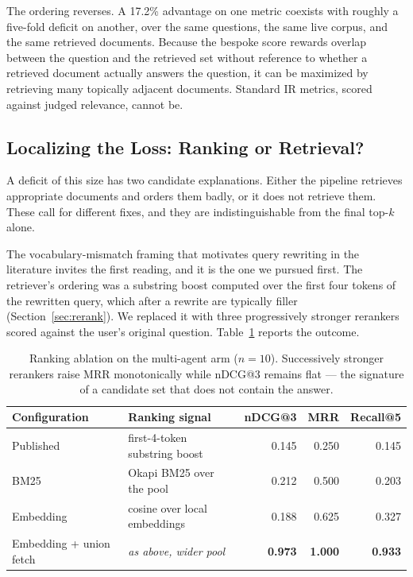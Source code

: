 The ordering reverses. A 17.2\% advantage on one metric coexists with roughly a
five-fold deficit on another, over the same questions, the same live corpus, and
the same retrieved documents. Because the bespoke score rewards overlap between
the question and the retrieved set without reference to whether a retrieved
document actually answers the question, it can be maximized by retrieving many
topically adjacent documents. Standard IR metrics, scored against judged
relevance, cannot be.

\subsection{Localizing the Loss: Ranking or Retrieval?}\label{sec:localizing}

A deficit of this size has two candidate explanations. Either the pipeline
retrieves appropriate documents and orders them badly, or it does not retrieve
them. These call for different fixes, and they are indistinguishable from the
final top-$k$ alone.

The vocabulary-mismatch framing that motivates query rewriting in the literature
invites the first reading, and it is the one we pursued first. The retriever's
ordering was a substring boost computed over the first four tokens of the
rewritten query, which after a rewrite are typically filler
(Section~\ref{sec:rerank}). We replaced it with three progressively stronger
rerankers scored against the user's original question.
Table~\ref{tab:ranking-ablation} reports the outcome.

\begin{table}[t]
\caption{Ranking ablation on the multi-agent arm ($n=10$). Successively stronger
rerankers raise MRR monotonically while nDCG@3 remains flat --- the signature of
a candidate set that does not contain the answer.}
\label{tab:ranking-ablation}
\begin{tabular}{llrrr}
\toprule
Configuration & Ranking signal & nDCG@3 & MRR & Recall@5 \\
\midrule
Published & first-4-token substring boost & 0.145 & 0.250 & 0.145 \\
BM25       & Okapi BM25 over the pool      & 0.212 & 0.500 & 0.203 \\
Embedding  & cosine over local embeddings  & 0.188 & 0.625 & 0.327 \\
\midrule
Embedding + union fetch & \emph{as above, wider pool} & \textbf{0.973} & \textbf{1.000} & \textbf{0.933} \\
\bottomrule
\end{tabular}
\end{table}

